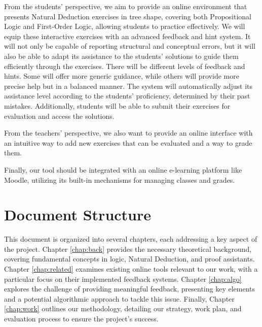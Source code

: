 From the students' perspective, we aim to provide an online environment that presents Natural Deduction exercises in tree shape, covering both Propositional Logic and First-Order Logic, allowing students to practice effectively. We will equip these interactive exercises with an advanced feedback and hint system. It will not only be capable of reporting structural and conceptual errors, but it will also be able to adapt its assistance to the students' solutions to guide them efficiently through the exercises. There will be different levels of feedback and hints. Some will offer more generic guidance, while others will provide more precise help but in a balanced manner. The system will automatically adjust its assistance level according to the students' proficiency, determined by their past mistakes. Additionally, students will be able to submit their exercises for evaluation and access the solutions.

From the teachers' perspective, we also want to provide an online interface with an intuitive way to add new exercises that can be evaluated and a way to grade them.

Finally, our tool should be integrated with an online e-learning platform like Moodle, utilizing its built-in mechanisms for managing classes and grades.

\section{Document Structure}

This document is organized into several chapters, each addressing a key aspect of the project. Chapter \ref{chap:back} provides the necessary theoretical background, covering fundamental concepts in logic, Natural Deduction, and proof assistants. Chapter \ref{chap:related} examines existing online tools relevant to our work, with a particular focus on their implemented feedback systems. Chapter \ref{chap:algo} explores the challenge of providing meaningful feedback, presenting key elements and a potential algorithmic approach to tackle this issue. Finally, Chapter \ref{chap:work} outlines our methodology, detailing our strategy, work plan, and evaluation process to ensure the project's success.


